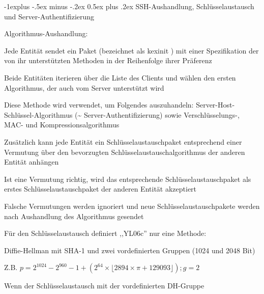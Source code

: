 \documentclass[a4paper]{article}
\makeatletter
\renewcommand{\subsection}{\@startsection{subsection}{2}{0mm}%
 {-1explus -.5ex minus -.2ex}%
 {0.5ex plus .2ex}%
 {\normalfont\normalsize\bfseries}}
\makeatother
\begin{document}
\begin{multicols}{3}
\begin{itemize*}
            \subsection{SSH-Aushandlung, Schlüsselaustausch und
                  Server-Authentifizierung}
            \begin{itemize*}
                  \item Algorithmus-Aushandlung:
                  \begin{itemize*}
                        \item Jede Entität sendet ein Paket (bezeichnet als kexinit ) mit einer Spezifikation der von ihr unterstützten Methoden in der Reihenfolge ihrer Präferenz
                        \item Beide Entitäten iterieren über die Liste des Clients und wählen den ersten Algorithmus, der auch vom Server unterstützt wird
                        \item Diese Methode wird verwendet, um Folgendes auszuhandeln: Server-Host-Schlüssel-Algorithmus (\textasciitilde{} Server-Authentifizierung) sowie Verschlüsselungs-, MAC- und Kompressionsalgorithmus
                        \item Zusätzlich kann jede Entität ein Schlüsselaustauschpaket entsprechend einer Vermutung über den bevorzugten Schlüsselaustauschalgorithmus der anderen Entität anhängen
                        \item Ist eine Vermutung richtig, wird das entsprechende Schlüsselaustauschpaket als erstes Schlüsselaustauschpaket der anderen Entität akzeptiert
                        \item Falsche Vermutungen werden ignoriert und neue Schlüsselaustauschpakete werden nach Aushandlung des Algorithmus gesendet
                  \end{itemize*}
                  \item Für den Schlüsselaustausch definiert ,,YL06c'' nur eine Methode:
                  \begin{itemize*}
                        \item Diffie-Hellman mit SHA-1 und zwei vordefinierten Gruppen (1024 und 2048 Bit)
                        \item Z.B. $p = 2^{1024} -2^{960} - 1 + (2^{64}\times \lfloor 2894 \times \pi + 129093\rfloor); g = 2$
                  \end{itemize*}
                  \item Wenn der Schlüsselaustausch mit der vordefinierten DH-Gruppe

\end{itemize*}
\end{itemize*}
\end{multicols}
\end{document}
